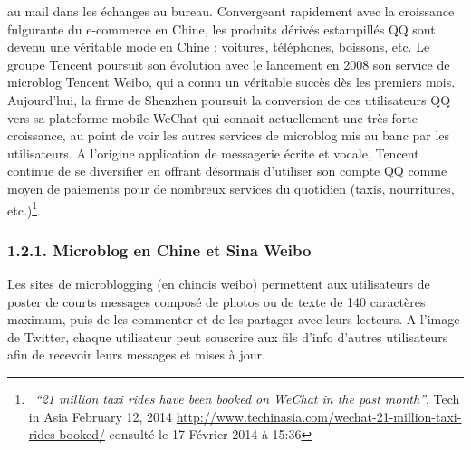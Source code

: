 {au mail dans les \'echanges au bureau. Convergeant rapidement avec la croissance fulgurante du e-commerce en Chine, les
produits d\'eriv\'es estampill\'es QQ sont devenu une v\'eritable mode en Chine : voitures, t\'el\'ephones, boissons,
etc. Le groupe Tencent poursuit son \'evolution avec le lancement en 2008 son service de microblog Tencent Weibo, qui a
connu un v\'eritable succ\`es d\`es les premiers mois. Aujourd'hui, la firme de Shenzhen poursuit la conversion de ces
utilisateurs QQ vers sa plateforme mobile WeChat qui connait actuellement une tr\`es forte croissance, au point de voir
les autres services de microblog mis au banc par les utilisateurs. A l'origine application de messagerie \'ecrite et
vocale, Tencent continue de se diversifier en offrant d\'esormais d'utiliser son compte QQ comme moyen de paiements
pour de nombreux services du quotidien (taxis, nourritures, etc.)\footnote{\ \textit{{}``}\textit{21 million taxi rides
have been booked on WeChat in the past month''}, Tech in Asia February 12, 2014
\url{http://www.techinasia.com/wechat-21-million-taxi-rides-booked/} consult\'e le 17 F\'evrier 2014 \`a 15:36}.}

\subsubsection[1.2.1. Microblog en Chine et Sina Weibo]{1.2.1. Microblog en Chine et Sina Weibo}
\hypertarget{RefHeading111699228146}{}{\color{black}
Les sites de microblogging (en chinois weibo) permettent aux utilisateurs de poster de courts messages compos\'e de
photos ou de texte de 140 caract\`eres maximum, puis de les commenter et de les partager avec leurs lecteurs. A l'image
de Twitter, chaque utilisateur peut souscrire aux fils d'info d'autres utilisateurs afin de recevoir leurs messages et
mises \`a jour.}


\bigskip

